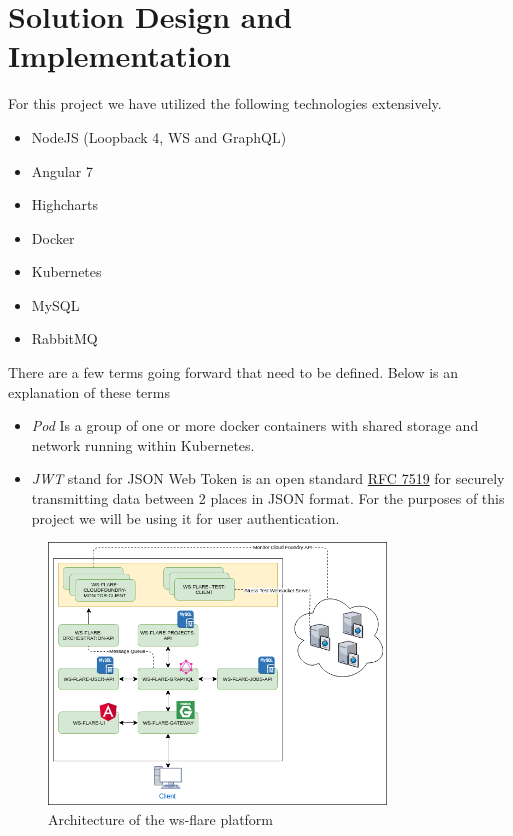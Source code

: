 \chapter{Solution Design and Implementation}

For this project we have utilized the following technologies extensively.

\begin{itemize}
  \item NodeJS (Loopback 4, WS and GraphQL)
  \item Angular 7
  \item Highcharts
  \item Docker
  \item Kubernetes
  \item MySQL
  \item RabbitMQ
\end{itemize}

There are a few terms going forward that need to be defined. Below is an explanation of these terms

\begin{itemize}
  \item \emph{Pod} Is a group of one or more docker containers with shared storage and network running within Kubernetes.
  \item \emph{JWT} stand for JSON Web Token is an open standard \href{https://tools.ietf.org/html/rfc7519}{RFC 7519} for securely transmitting data between 2 places in JSON format. For the purposes of this project we will be using it for user authentication.
\end{itemize}

\begin{figure}[!h]
  \centering
    \includegraphics[width=0.8\textwidth]{figures/architecture.png}
    \caption{Architecture of the ws-flare platform}
    \label{fig:https-handshake}
\end{figure}

